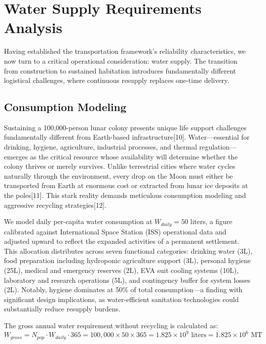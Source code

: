 \documentclass[12pt]{article}
\begin{document}
	\section{Water Supply Requirements Analysis}
	
	Having established the transportation framework's reliability characteristics, we now turn to a critical operational consideration: water supply. The transition from construction to sustained habitation introduces fundamentally different logistical challenges, where continuous resupply replaces one-time delivery.
	
	\subsection{Consumption Modeling}
	
Sustaining a 100,000-person lunar colony presents unique life support challenges fundamentally different from Earth-based infrastructure[10]. Water---essential for drinking, hygiene, agriculture, industrial processes, and thermal regulation---emerges as the critical resource whose availability will determine whether the colony thrives or merely survives. Unlike terrestrial cities where water cycles naturally through the environment, every drop on the Moon must either be transported from Earth at enormous cost or extracted from lunar ice deposits at the poles[11]. This stark reality demands meticulous consumption modeling and aggressive recycling strategies[12].

We model daily per-capita water consumption at $W_{daily} = 50$ liters, a figure calibrated against International Space Station (ISS) operational data and adjusted upward to reflect the expanded activities of a permanent settlement. This allocation distributes across seven functional categories: drinking water (3L), food preparation including hydroponic agriculture support (3L), personal hygiene (25L), medical and emergency reserves (2L), EVA suit cooling systems (10L), laboratory and research operations (5L), and contingency buffer for system losses (2L). Notably, hygiene dominates at 50\% of total consumption---a finding with significant design implications, as water-efficient sanitation technologies could substantially reduce resupply burdens.

The gross annual water requirement without recycling is calculated as:
\begin{equation}
	W_{gross} = N_{pop} \cdot W_{daily} \cdot 365 = 100,000 \times 50 \times 365 = 1.825 \times 10^9 \text{ liters} = 1.825 \times 10^6 \text{ MT}
\end{equation}
\end{document}
